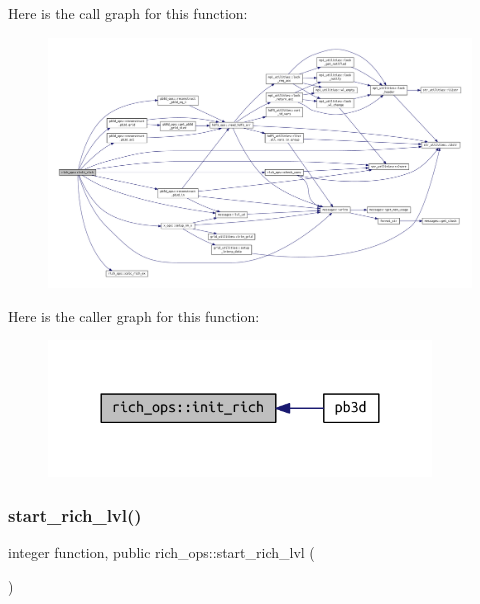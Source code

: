 Here is the call graph for this function\+:
\nopagebreak
\begin{figure}[H]
\begin{center}
\leavevmode
\includegraphics[width=350pt]{namespacerich__ops_a9fbbda93eab8973d33063e277c489e7b_cgraph}
\end{center}
\end{figure}
Here is the caller graph for this function\+:
\nopagebreak
\begin{figure}[H]
\begin{center}
\leavevmode
\includegraphics[width=288pt]{namespacerich__ops_a9fbbda93eab8973d33063e277c489e7b_icgraph}
\end{center}
\end{figure}
\mbox{\label{namespacerich__ops_a97206a15127960366fcb41d6889cb3b5}} 
\subsubsection{\texorpdfstring{start\+\_\+rich\+\_\+lvl()}{start\_rich\_lvl()}}
{\footnotesize\ttfamily integer function, public rich\+\_\+ops\+::start\+\_\+rich\+\_\+lvl (\begin{DoxyParamCaption}{ }\end{DoxyParamCaption})}



